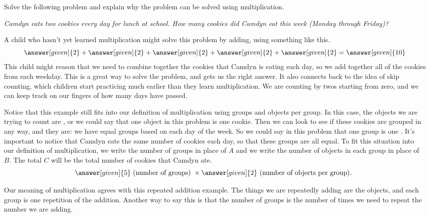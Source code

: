 \documentclass{ximera}
\begin{document}
\begin{example}
Solve the following problem and explain why the problem can be solved using multiplication.

\emph{Camdyn eats two cookies every day for lunch at school. How many cookies did Camdyn eat this week (Monday through Friday)?}

A child who hasn't yet learned multiplication might solve this problem by adding, using something like this.
\[
\answer[given]{2} + \answer[given]{2} + \answer[given]{2} + \answer[given]{2} + \answer[given]{2} = \answer[given]{10}
\]
This child might reason that we need to combine together the cookies that Camdyn is eating each day, so we add together all of the cookies from each weekday. This is a great way to solve the problem, and gets us the right answer. It also connects back to the idea of skip counting, which children start practicing much earlier than they learn multiplication. We are counting by twos starting from zero, and we can keep track on our fingers of how many days have passed.

Notice that this example still fits into our definition of multiplication using groups and objects per group. In this case, the objects we are trying to count are , or we could say that one object in this problem is one cookie. Then we can look to see if these cookies are grouped in any way, and they are: we have equal groups based on each day of the week. So we could say in this problem that one group is one . It's important to notice that Camdyn eats the same number of cookies each day, so that these groups are all equal. To fit this situation into our definition of multiplication, we write the number of groups in place of $A$ and we write the number of objects in each group in place of $B$. The total $C$ will be the total number of cookies that Camdyn ate.
\[
\answer[given]{5} \textrm{ (number of groups) } \times \answer[given]{2} \textrm{ (number of objects per group). }
\]

\end{example}

Our meaning of multiplication agrees with this repeated addition example. The things we are repeatedly adding are the objects, and each group is one repetition of the addition. Another way to say this is that the number of groups is the number of times we need to repeat the number we are adding.
\end{document}
